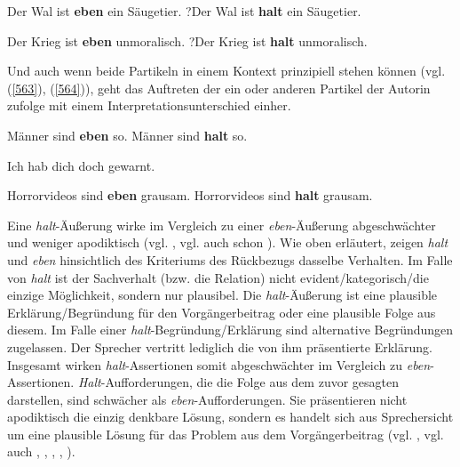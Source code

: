 \begin{exe}
	\ex\label{561} 
		\begin{xlist}	
			\ex\label{561a} Der Wal ist \textbf{eben} ein Säugetier.
			\ex\label{561b} ?Der Wal ist \textbf{halt} ein Säugetier.
		\end{xlist}
\end{exe}
\begin{exe}
	\ex\label{562} 
		\begin{xlist}	
			\ex\label{562a} Der Krieg ist \textbf{eben} unmoralisch.
			\ex\label{562b} ?Der Krieg ist \textbf{halt} unmoralisch.
			\hfill\hbox {\citet[124]{Thurmair1989}}
		\end{xlist}
\end{exe}
Und auch wenn beide Partikeln in einem Kontext prinzipiell stehen können (vgl. (\ref{563}), (\ref{564})), geht das Auftreten der ein oder anderen Partikel der Autorin zufolge mit einem Interpretationsunterschied einher.

\begin{exe}
	\ex\label{563} 
		\begin{xlist}	
			\ex\label{563a} Männer sind \textbf{eben} so.
			\ex\label{563b} Männer sind \textbf{halt} so.
		\end{xlist}
\end{exe}
\begin{exe}
	\ex\label{564} Ich hab dich doch gewarnt. 
		\begin{xlist}	
			\ex\label{564a} Horrorvideos sind \textbf{eben} grausam.	
			\ex\label{564b} Horrorvideos sind \textbf{halt} grausam.
			\hfill\hbox {\citet[124]{Thurmair1989}}
		\end{xlist}
\end{exe}
Eine \textit{halt}-Äußerung wirke im Vergleich zu einer \textit{eben}-Äußerung abgeschwächter und weniger apodiktisch (vgl. \citealt[125]{Thurmair1989}, vgl. auch schon \citealt[309]{Schlieben-Lange1979}). Wie oben erläutert, zeigen \textit{halt} und \textit{eben} hinsichtlich des Kriteriums des Rückbezugs dasselbe Verhalten. Im Falle von \textit{halt} ist der Sachverhalt (bzw. die Relation) nicht evident/kategorisch/die einzige Möglichkeit, sondern nur plausibel. Die \textit{halt}-Äußerung ist eine plausible Erklärung/Begründung für den Vorgängerbeitrag oder eine plausible Folge aus diesem. Im Falle einer \textit{halt}-Begründung/Erklärung sind alternative Begründungen zugelassen. Der Sprecher vertritt lediglich die von ihm präsentierte Erklärung. Insgesamt wirken \textit{halt}-Assertionen somit abgeschwächter im Vergleich zu \textit{eben}-Assertionen. \textit{Halt}-Auffor\-derungen,  die die Folge aus dem zuvor gesagten darstellen, sind schwächer als \textit{eben}-Aufforderungen. Sie präsentieren nicht apodiktisch die einzig denkbare Lösung, sondern es handelt sich aus Sprechersicht um eine plausible Lösung für das Problem aus dem Vorgängerbeitrag (vgl. \citealt[125-126]{Thurmair1989}, vgl. auch \citealt[316]{Schlieben-Lange1979}, \citealt[74-75]{Hartog1982}, \citealt[235]{Meibauer1994}, \citealt[312]{Rost-Roth1998}, \citealt[98]{Autenrieth2002}).

